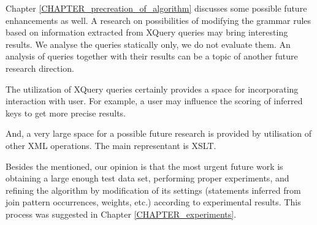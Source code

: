 Chapter \ref{CHAPTER_precreation_of_algorithm} discusses some possible future enhancements as well. A research on possibilities of modifying the grammar rules based on information extracted from XQuery queries may bring interesting results. We analyse the queries statically only, we do not evaluate them. An analysis of queries together with their results can be a topic of another future research direction.

The utilization of XQuery queries certainly provides a space for incorporating interaction with user. For example, a user may influence the scoring of inferred keys to get more precise results.

And, a very large space for a possible future research is provided by utilisation of other XML operations. The main representant is XSLT.

Besides the mentioned, our opinion is that the most urgent future work is obtaining a large enough test data set, performing proper experiments, and refining the algorithm by modification of its settings (statements inferred from join pattern occurrences, weights, etc.) according to experimental results. This process was suggested in Chapter \ref{CHAPTER_experiments}.